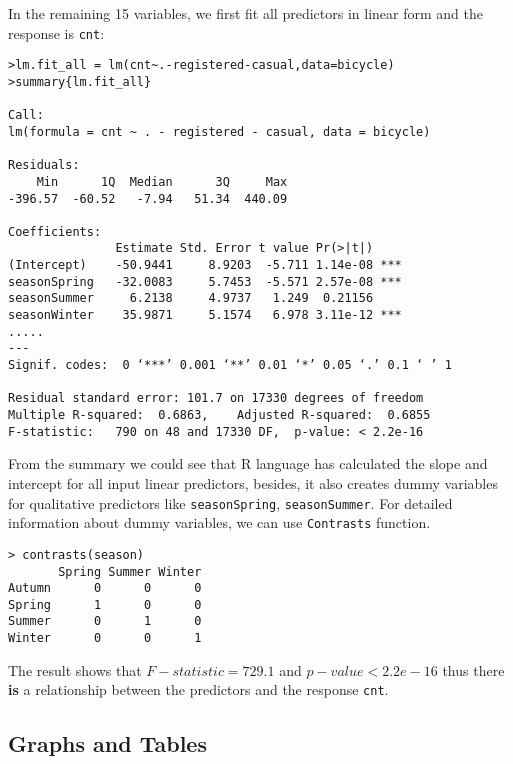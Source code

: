 In the remaining 15 variables, we first fit all predictors in linear form and the response is \texttt{cnt}:
\begin{lstlisting}[style=rlanguage]
>lm.fit_all = lm(cnt~.-registered-casual,data=bicycle)
>summary{lm.fit_all}

Call:
lm(formula = cnt ~ . - registered - casual, data = bicycle)

Residuals:
    Min      1Q  Median      3Q     Max
-396.57  -60.52   -7.94   51.34  440.09

Coefficients:
               Estimate Std. Error t value Pr(>|t|)
(Intercept)    -50.9441     8.9203  -5.711 1.14e-08 ***
seasonSpring   -32.0083     5.7453  -5.571 2.57e-08 ***
seasonSummer     6.2138     4.9737   1.249  0.21156
seasonWinter    35.9871     5.1574   6.978 3.11e-12 ***
.....
---
Signif. codes:  0 ‘***’ 0.001 ‘**’ 0.01 ‘*’ 0.05 ‘.’ 0.1 ‘ ’ 1

Residual standard error: 101.7 on 17330 degrees of freedom
Multiple R-squared:  0.6863,	Adjusted R-squared:  0.6855
F-statistic:   790 on 48 and 17330 DF,  p-value: < 2.2e-16
\end{lstlisting}
From the summary we could see that R language has calculated the slope and intercept for all input linear predictors, besides, it also creates dummy variables for qualitative predictors like \texttt{seasonSpring}, \texttt{seasonSummer}. For detailed information about dummy variables, we can use \texttt{Contrasts} function.

\begin{lstlisting}[style=rlanguage]
> contrasts(season)
       Spring Summer Winter
Autumn      0      0      0
Spring      1      0      0
Summer      0      1      0
Winter      0      0      1
\end{lstlisting}

The result shows that $F-statistic = 729.1$ and $p-value < 2.2e-16$ thus there \textbf{is} a relationship between the predictors and the response \texttt{cnt}. 



\subsection{Graphs and Tables} 